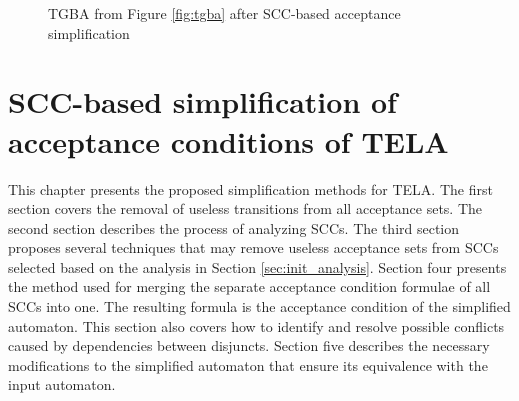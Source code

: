 \documentclass[
  digital, %
  twoside, %
  table,   %
  lof,     %
  lot,     %
]{fithesis3}
\begin{document}
\begin{figure}[h]
    \begin{center}
    \caption{TGBA from Figure \ref{fig:tgba} after SCC-based acceptance simplification}
    \label{fig:simpl_tgba}
  \end{center}
\end{figure}


\chapter{SCC-based simplification of acceptance conditions of TELA}
\label{chap:simpl_tela}
This chapter presents the proposed simplification methods for TELA. The first section covers the removal of useless transitions from all acceptance sets. The second section describes the process of analyzing SCCs. The third section proposes several techniques that may remove useless acceptance sets from SCCs selected based on the analysis in Section \ref{sec:init_analysis}. Section four presents the method used for merging the separate acceptance condition formulae of all SCCs into one. The resulting formula is the acceptance condition of the simplified automaton. This section also covers how to identify and resolve possible conflicts caused by dependencies between disjuncts. Section five describes the necessary modifications to the simplified automaton that ensure its equivalence with the input automaton. 
\end{document}

